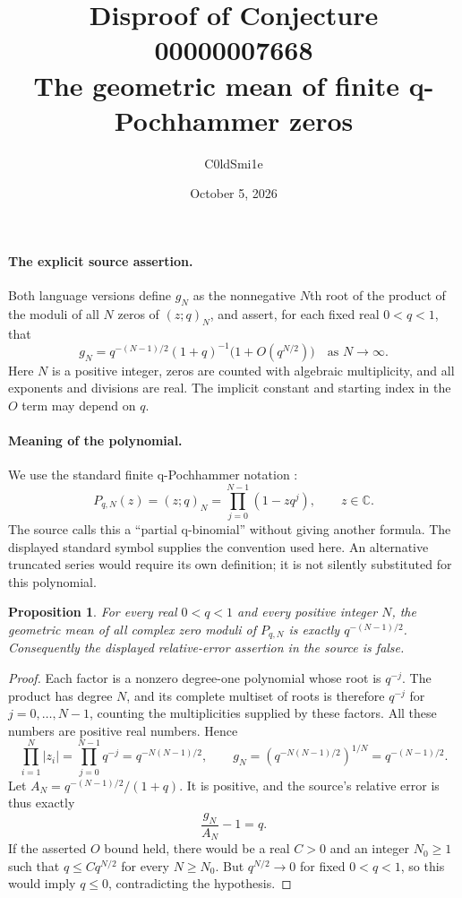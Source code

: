 \documentclass[11pt]{article}
\title{Disproof of Conjecture 00000007668\\\large The geometric mean of finite q-Pochhammer zeros}
\author{C0ldSmi1e}
\date{October 5, 2026}
\newtheorem{proposition}{Proposition}
\newcommand{\C}{\mathbb{C}}
\begin{document}
\maketitle

\paragraph{The explicit source assertion.}
Both language versions define $g_N$ as the nonnegative $N$th root of the
product of the moduli of all $N$ zeros of $(z;q)_N$, and assert, for each
fixed real $0<q<1$, that
\[
 g_N=q^{-(N-1)/2}(1+q)^{-1}\bigl(1+O(q^{N/2})\bigr)
 \quad\text{as }N\longrightarrow\infty.
\]
Here $N$ is a positive integer, zeros are counted with algebraic multiplicity,
and all exponents and divisions are real. The implicit constant and starting
index in the $O$ term may depend on $q$.

\paragraph{Meaning of the polynomial.}
We use the standard finite q-Pochhammer notation \cite{DLMF}:
\[
 P_{q,N}(z)=(z;q)_N=\prod_{j=0}^{N-1}(1-zq^j),\qquad z\in\C.
\]
The source calls this a ``partial q-binomial'' without giving another formula.
The displayed standard symbol supplies the convention used here. An
alternative truncated series would require its own definition; it is not
silently substituted for this polynomial.

\begin{proposition}
For every real $0<q<1$ and every positive integer $N$, the geometric mean of
all complex zero moduli of $P_{q,N}$ is exactly $q^{-(N-1)/2}$.
Consequently the displayed relative-error assertion in the source is false.
\end{proposition}
\begin{proof}
Each factor is a nonzero degree-one polynomial whose root is $q^{-j}$.
The product has degree $N$, and its complete multiset of roots is therefore
$q^{-j}$ for $j=0,\ldots,N-1$, counting the multiplicities supplied by these
factors. All these numbers are positive real numbers. Hence
\[
 \prod_{i=1}^{N}|z_i|
 =\prod_{j=0}^{N-1}q^{-j}
 =q^{-N(N-1)/2},\qquad
 g_N=\left(q^{-N(N-1)/2}\right)^{1/N}=q^{-(N-1)/2}.
\]
Let $A_N=q^{-(N-1)/2}/(1+q)$. It is positive, and the source's relative error
is thus exactly
\[
 \frac{g_N}{A_N}-1=q.
\]
If the asserted $O$ bound held, there would be a real $C>0$ and an integer
$N_0\ge1$ such that $q\le Cq^{N/2}$ for every $N\ge N_0$.
But $q^{N/2}\to0$ for fixed $0<q<1$, so this would imply $q\le0$,
contradicting the hypothesis.
\end{proof}
\end{document}
